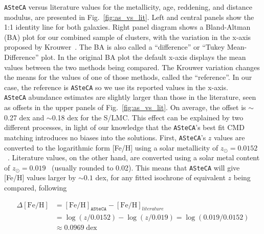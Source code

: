 \documentclass{aa}
\begin{document}
\texttt{ASteCA} versus literature values for the metallicity, age, reddening,
and distance modulus, are presented in Fig.~\ref{fig:as_vs_lit}. Left and
central panels show the 1:1 identity line for both galaxies.
%
Right panel diagram shows a Bland-Altman (BA) plot for our combined sample
of clusters, with the variation in the x-axis proposed by
Krouwer~\citep{Bland_1986,Krouwer_2008}. The BA is also called a
``difference'' or ``Tukey Mean-Difference'' plot. In the original BA plot the
default x-axis displays the mean values between the two methods being compared.
The Krouwer variation changes the means for the values of one of those methods,
called the ``reference''. In our case, the reference is \texttt{ASteCA}
so we use its reported values in the x-axis.\\
%

\texttt{ASteCA} abundance estimates are slightly larger than those in
the literature, seen as offsets in the upper panels of Fig.~\ref{fig:as_vs_lit}.
On average, the offset is $\sim$0.27 dex and $\sim$0.18 dex for the S/LMC.\@
%
This effect can be explained by two different processes, in light of our
knowledge that the \texttt{ASteCA}'s best fit CMD matching introduces no
biases into the solutions.
%
First, \texttt{ASteCA}'s $z$ values are converted to the logarithmic
form [Fe/H] using a solar metallicity of
$z_{\odot}{=}0.0152$~\citep{Bressan_2012}.
Literature values, on the other hand, are converted using a solar
metal content of $z_{\odot}{=}0.019$~\citep{Marigo_2008} (usually
rounded to 0.02). This means that \texttt{ASteCA} will give [Fe/H] values
larger by ${\sim}0.1$ dex, for any fitted isochrone of equivalent $z$ being
compared, following

\begin{equation}
\begin{split}
\Delta\mathrm{[Fe/H]} & = \mathrm{[Fe/H]}_{\mathtt{ASteCA}} -
\mathrm{[Fe/H]}_{literature} \\
& = \log(z/0.0152) - \log(z/0.019) = \log(0.019/0.0152) \\
& \approx 0.0969 \;\mathrm{dex}
\end{split}
\label{eq:delta_feh}
\end{equation}
\end{document}
